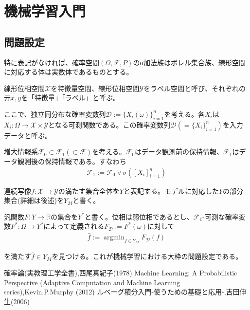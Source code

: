 \documentclass[dvipdfmx, a4paper]{jsarticle}
\DeclareMathOperator*{\argmin}{argmin}
\begin{document}
\newpage
\section{機械学習入門}
\subsection{問題設定}
特に表記がなければ、確率空間$(\Omega,\mathcal{F},P)$のσ加法族はボレル集合族、線形空間に対応する体は実数体であるものとする。

線形位相空間$\mathcal{X}$を特徴量空間、線形位相空間$\mathcal{Y}$をラベル空間と呼び、それぞれの元$x,y$を「特徴量」「ラベル」と呼ぶ。

ここで、独立同分布な確率変数列$\mathcal{D}:=\{X_i(\omega)\}_{i=1}^n$を考える。各$X_i$は$X_i:\Omega\rightarrow\mathcal{X}\times\mathcal{Y}$となる可測関数である。この確率変数列$\mathcal{D}(=\{X_i\}_{i=1}^n)$を入力データと呼ぶ。

増大情報系$\mathcal{F}_0\subset\mathcal{F}_1(\subset\mathcal{F})$を考える。$\mathcal{F}_0$はデータ観測前の保持情報、$\mathcal{F}_1$はデータ観測後の保持情報である。すなわち
\begin{align}
\mathcal{F}_1:=\mathcal{F}_0\vee\sigma([X_i]^n_{i=1})
\end{align}

連続写像$f:\mathcal{X}\rightarrow\mathcal{Y}$の満たす集合全体を$Y$と表記する。モデルに対応した$Y$の部分集合(詳細は後述)を$Y_M$と書く。

汎関数$F:Y\rightarrow\mathbb{R}$の集合を$Y^*$と書く。位相は弱位相であるとし、$\mathcal{F}_1$-可測な確率変数$F^*:\Omega\rightarrow Y^*$によって定義される$F_\mathcal{D}:=F^*(\omega)$に対して
\begin{align}
\hat{f}:=\argmin_{f\in Y_M}F_\mathcal{D}(f)
\end{align}

を満たす$\hat{f}\in Y_M$を見つける。これが機械学習における大枠の問題設定である。



\newpage
\begin{thebibliography}{99}
   確率論(実教理工学全書),西尾真紀子(1978)
   Machine Learning: A Probabilistic Perspective (Adaptive Computation and Machine Learning series),Kevin.P.Murphy (2012)
   ルベーグ積分入門-使うための基礎と応用-,吉田伸生(2006)
\end{thebibliography}
\end{document}
